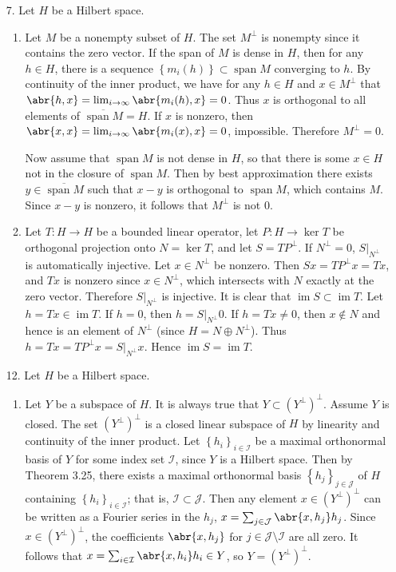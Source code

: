 \documentclass[11pt,leqno]{article}
\theoremstyle{plain}
\theoremstyle{definition}
\numberwithin{equation}{section}
\numberwithin{lem}{section}
\newcommand{\cbr}[1]{\left\{#1\right\}}
\DeclareMathOperator{\Span}{span}
\DeclareMathOperator{\im}{im}
\begin{document}
\begin{enumerate}
\begin{enumerate}
    \end{enumerate}
    \item[7.] Let $H$ be a Hilbert space.
    \begin{enumerate}
      \item Let $M$ be a nonempty subset of $H$. The set $M^\perp$ is nonempty since it contains the zero vector. If the span of $M$ is dense in $H$, then for any $h\in H$, there is a sequence $\cbr{m_i(h)}\subset \Span M$ converging to $h$. By continuity of the inner product, we have for any $h\in H$ and $x\in M^\perp$ that $\abr{h,x} = \lim_{i\to\infty}\abr{m_i(h),x} = 0$. Thus $x$ is orthogonal to all elements of $\overline{\Span M}= H$. If $x$ is nonzero, then $\abr{x,x} = \lim_{i\to\infty}\abr{m_i(x),x} =0$, impossible. Therefore $M^{\perp} =0$.
      
      Now assume that $\Span M$ is not dense in $H$, so that there is some $x\in H$ not in the closure of $\Span M$. Then by best approximation there exists $y\in \overline{\Span M}$ such that $x-y$ is orthogonal to $\Span M$, which contains $M$. Since $x-y$ is nonzero, it follows that $M^\perp$ is not $0$.
      \item Let $T\colon H\to H$ be a bounded linear operator, let $P\colon H\to\ker T$ be orthogonal projection onto $N = \ker T$, and let $S = TP^\perp$. If $N^\perp = 0$, $S|_{N^\perp}$ is automatically injective. Let $x\in N^\perp$ be nonzero. Then $Sx = TP^\perp x = Tx$, and $Tx$ is nonzero since $x\in N^\perp$, which intersects with $N$ exactly at the zero vector. Therefore $S|_{N^\perp}$ is injective. It is clear that $\im S\subset \im T$. Let $h = Tx\in \im T$. If $h = 0$, then $h = S|_{N^\perp}0$. If $h = Tx \neq 0$, then $x\not\in N$ and hence is an element of $N^\perp$ (since $H = N\oplus N^\perp$). Thus $h = Tx = TP^\perp x = S|_{N^\perp}x$. Hence $\im S = \im T$.
    \end{enumerate}
    \item[12.] Let $H$ be a Hilbert space.
    \begin{enumerate}
      \item Let $Y$ be a subspace of $H$. It is always true that $Y\subset (Y^\perp)^\perp$. Assume $Y$ is closed. The set $(Y^\perp)^\perp$ is a closed linear subspace of $H$ by linearity and continuity of the inner product. Let $\cbr{h_i}_{i\in \mathcal I}$ be a maximal orthonormal basis of $Y$ for some index set $\mathcal I$, since $Y$ is a Hilbert space. Then by Theorem 3.25, there exists a maximal orthonormal basis $\cbr{h_j}_{j\in \mathcal J}$ of $H$ containing $\cbr{h_i}_{i\in \mathcal I}$; that is, $\mathcal I\subset \mathcal J$. Then any element $x\in (Y^\perp)^\perp$ can be written as a Fourier series in the $h_j$, $x = \sum_{j\in \mathcal J}\abr{x,h_j}h_j$. Since $x\in (Y^\perp)^\perp$, the coefficients $\abr{x,h_j}$ for $j\in \mathcal J\setminus \mathcal I$ are all zero. It follows that $x = \sum_{i\in \mathcal I}\abr{x,h_i}h_i\in Y$, so $Y = (Y^\perp)^\perp$.

\end{enumerate}
\end{enumerate}
\end{document}
